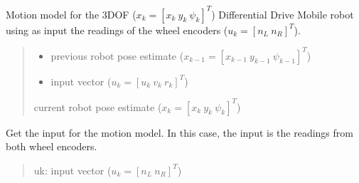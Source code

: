 \documentclass[letterpaper,10pt,english]{sphinxmanual}
\begin{document}
\begin{fulllineitems}
\begin{fulllineitems}
\label{\detokenize{DRLocalization:DR_3DOFDifferentialDrive.DR_3DOFDifferentialDrive.Localize}}
\pysigstartsignatures
{}
\pysigstopsignatures
\sphinxAtStartPar
Motion model for the 3DOF (\(x_k=[x_{k}~y_{k}~\psi_{k}]^T\)) Differential Drive Mobile robot using as input the readings of the wheel encoders (\(u_k=[n_L~n_R]^T\)).
\begin{quote}\begin{description}
\begin{itemize}
\item {} 
\sphinxAtStartPar
{} \textendash{} previous robot pose estimate (\(x_{k-1}=[x_{k-1}~y_{k-1}~\psi_{k-1}]^T\))

\item {} 
\sphinxAtStartPar
{} \textendash{} input vector (\(u_k=[u_{k}~v_{k}~r_{k}]^T\))

\end{itemize}

\sphinxAtStartPar
current robot pose estimate (\(x_k=[x_{k}~y_{k}~\psi_{k}]^T\))

\end{description}\end{quote}

\end{fulllineitems}


\begin{fulllineitems}
\label{\detokenize{DRLocalization:DR_3DOFDifferentialDrive.DR_3DOFDifferentialDrive.GetInput}}
\pysigstartsignatures
{}
\pysigstopsignatures
\sphinxAtStartPar
Get the input for the motion model. In this case, the input is the readings from both wheel encoders.
\begin{quote}\begin{description}
\sphinxAtStartPar
uk:  input vector (\(u_k=[n_L~n_R]^T\))

\end{description}\end{quote}

\end{fulllineitems}


\end{fulllineitems}
\end{document}
